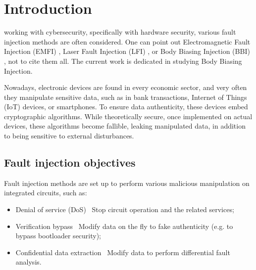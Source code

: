 
\section{Introduction}

	 working with cybersecurity, specifically with hardware security, various fault injection methods are often considered.
	One can point out Electromagnetic Fault Injection (EMFI) \cite{mathieuEMFIFirst, mathieuEMFI}, Laser Fault Injection (LFI) \cite{lfiFaultModel}, or Body Biasing Injection (BBI) \cite{bbiOrigin}, not to cite them all.
	The current work is dedicated in studying Body Biasing Injection.

	Nowadays, electronic devices are found in every economic sector, and very often they manipulate sensitive data, such as in bank transactions, Internet of Things (IoT) devices, or smartphones.
	To ensure data authenticity, these devices embed cryptographic algorithms.
	While theoretically secure, once implemented on actual devices, these algorithms become fallible, leaking manipulated data, in addition to being sensitive to external disturbances.

	\subsection{Fault injection objectives}
		Fault injection methods are set up to perform various malicious manipulation on integrated circuits, such as:
		\begin{itemize}
			\item Denial of service (DoS) \textrightarrow\ Stop circuit operation and the related services;
			\item Verification bypass \textrightarrow\ Modify data on the fly to fake authenticity (e.g. to bypass bootloader security);
			\item Confidential data extraction \textrightarrow\ Modify data to perform differential fault analysis.
		\end{itemize}

